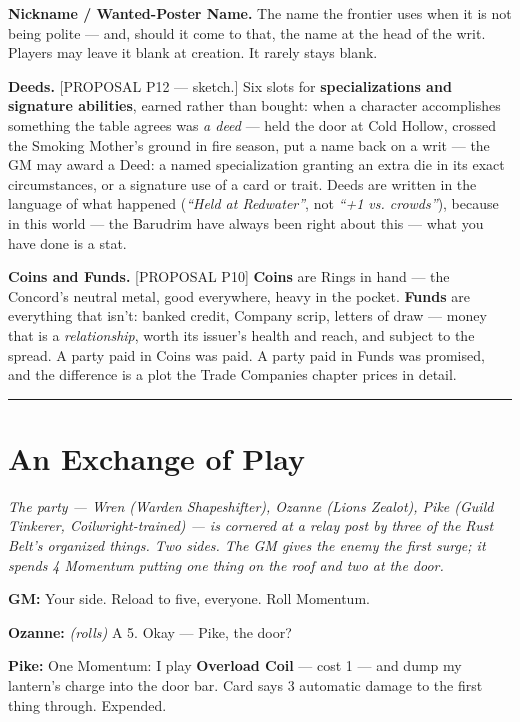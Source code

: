 \textbf{Nickname / Wanted-Poster Name.} The name the frontier uses when it is not being polite --- and, should it come to that, the name at the head of the writ. Players may leave it blank at creation. It rarely stays blank.

\textbf{Deeds.} [PROPOSAL P12 --- sketch.] Six slots for \textbf{specializations and signature abilities}, earned rather than bought: when a character accomplishes something the table agrees was \textit{a deed} --- held the door at Cold Hollow, crossed the Smoking Mother's ground in fire season, put a name back on a writ --- the GM may award a Deed: a named specialization granting an extra die in its exact circumstances, or a signature use of a card or trait. Deeds are written in the language of what happened (\textit{``Held at Redwater''}, not \textit{``+1 vs. crowds''}), because in this world --- the Barudrim have always been right about this --- what you have done is a stat.

\textbf{Coins and Funds.} [PROPOSAL P10] \textbf{Coins} are Rings in hand --- the Concord's neutral metal, good everywhere, heavy in the pocket. \textbf{Funds} are everything that isn't: banked credit, Company scrip, letters of draw --- money that is a \textit{relationship}, worth its issuer's health and reach, and subject to the spread. A party paid in Coins was paid. A party paid in Funds was promised, and the difference is a plot the Trade Companies chapter prices in detail.

\medskip\hrule\medskip

\section{An Exchange of Play}

\textit{The party --- Wren (Warden Shapeshifter), Ozanne (Lions Zealot), Pike (Guild Tinkerer, Coilwright-trained) --- is cornered at a relay post by three of the Rust Belt's organized things. Two sides. The GM gives the enemy the first surge; it spends 4 Momentum putting one thing on the roof and two at the door.}

\medskip

\textbf{GM:} Your side. Reload to five, everyone. Roll Momentum.

\textbf{Ozanne:} \textit{(rolls)} A 5. Okay --- Pike, the door?

\textbf{Pike:} One Momentum: I play \textbf{Overload Coil} --- cost 1 --- and dump my lantern's charge into the door bar. Card says 3 automatic damage to the first thing through. Expended.

